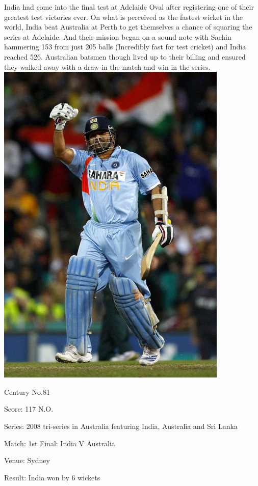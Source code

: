 \documentclass[11pt, a4paper]{article}
\begin{document}
India had come into the final test at Adelaide Oval after registering one of their greatest test victories ever. On what is perceived as the fastest wicket in the world, India beat Australia at Perth to get 
themselves a chance of squaring the series at Adelaide. And their mission began on a sound note with Sachin hammering 153 from just 205 balls (Incredibly fast for test cricket) and India reached 526. Australian batsmen though lived up to their billing and ensured they walked away with a draw in the match and win in the series.
\newpage
\includegraphics[height=0.7\textheight]{pics/81.jpg}

Century No.81 

Score: 117 N.O. 

Series: 2008 tri-series in Australia featuring India, Australia and Sri Lanka 

Match: 1st Final: India V Australia 

Venue: Sydney 

Result: India won by 6 wickets 
\end{document}
